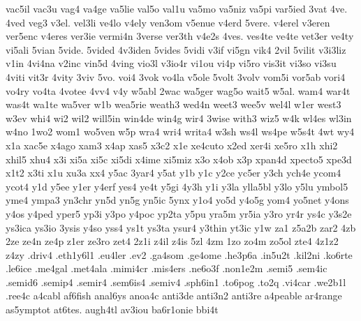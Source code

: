 {vac5il
vac3u
vag4
va4ge
va5lie
val5o
val1u
va5mo
va5niz
va5pi
var5ied
3vat
4ve.
4ved
veg3
v3el.
vel3li
ve4lo
v4ely
ven3om
v5enue
v4erd
5vere.
v4erel
v3eren
ver5enc
v4eres
ver3ie
vermi4n
3verse
ver3th
v4e2s
4ves.
ves4te
ve4te
vet3er
ve4ty
vi5ali
5vian
5vide.
5vided
4v3iden
5vides
5vidi
v3if
vi5gn
vik4
2vil
5vilit
v3i3liz
v1in
4vi4na
v2inc
vin5d
4ving
vio3l
v3io4r
vi1ou
vi4p
vi5ro
vis3it
vi3so
vi3su
4viti
vit3r
4vity
3viv
5vo.
voi4
3vok
vo4la
v5ole
5volt
3volv
vom5i
vor5ab
vori4
vo4ry
vo4ta
4votee
4vv4
v4y
w5abl
2wac
wa5ger
wag5o
wait5
w5al.
wam4
war4t
was4t
wa1te
wa5ver
w1b
wea5rie
weath3
wed4n
weet3
wee5v
wel4l
w1er
west3
w3ev
whi4
wi2
wil2
will5in
win4de
win4g
wir4
3wise
with3
wiz5
w4k
wl4es
wl3in
w4no
1wo2
wom1
wo5ven
w5p
wra4
wri4
writa4
w3sh
ws4l
ws4pe
w5s4t
4wt
wy4
x1a
xac5e
x4ago
xam3
x4ap
xas5
x3c2
x1e
xe4cuto
x2ed
xer4i
xe5ro
x1h
xhi2
xhil5
xhu4
x3i
xi5a
xi5c
xi5di
x4ime
xi5miz
x3o
x4ob
x3p
xpan4d
xpecto5
xpe3d
x1t2
x3ti
x1u
xu3a
xx4
y5ac
3yar4
y5at
y1b
y1c
y2ce
yc5er
y3ch
ych4e
ycom4
ycot4
y1d
y5ee
y1er
y4erf
yes4
ye4t
y5gi
4y3h
y1i
y3la
ylla5bl
y3lo
y5lu
ymbol5
yme4
ympa3
yn3chr
yn5d
yn5g
yn5ic
5ynx
y1o4
yo5d
y4o5g
yom4
yo5net
y4ons
y4os
y4ped
yper5
yp3i
y3po
y4poc
yp2ta
y5pu
yra5m
yr5ia
y3ro
yr4r
ys4c
y3s2e
ys3ica
ys3io
3ysis
y4so
yss4
ys1t
ys3ta
ysur4
y3thin
yt3ic
y1w
za1
z5a2b
zar2
4zb
2ze
ze4n
ze4p
z1er
ze3ro
zet4
2z1i
z4il
z4is
5zl
4zm
1zo
zo4m
zo5ol
zte4
4z1z2
z4zy
.driv4
.eth1y6l1
.eu4ler
.ev2
.ga4som
.ge4ome
.he3p6a
.in5u2t
.kil2ni
.ko6rte
.le6ice
.me4gal
.met4ala
.mimi4cr
.mis4ers
.ne6o3f
.non1e2m
.semi5
.sem4ic
.semid6
.semip4
.semir4
.sem6is4
.semiv4
.sph6in1
.to6pog
.to2q
.vi4car
.we2b1l
.ree4c
a4cabl
af6fish
anal6ys
anoa4c
anti3de
anti3n2
anti3re
a4peable
ar4range
as5ymptot
at6tes.
augh4tl
av3iou
ba6r1onie
bbi4t
}
